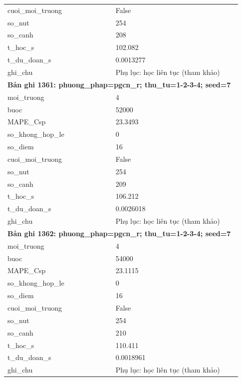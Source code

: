 \begin{longtable}{p{0.43\linewidth}p{0.50\linewidth}}
cuoi\_\allowbreak moi\_\allowbreak truong & False \\
so\_\allowbreak nut & 254 \\
so\_\allowbreak canh & 208 \\
t\_\allowbreak hoc\_\allowbreak s & 102.082 \\
t\_\allowbreak du\_\allowbreak doan\_\allowbreak s & 0.0013277 \\
ghi\_\allowbreak chu & Phụ lục: học liên tục (tham khảo) \\
\midrule
\multicolumn{2}{p{0.95\linewidth}}{\textbf{Bản ghi 1361: phuong\_phap=pgcn\_r; thu\_tu=1-2-3-4; seed=7}} \\
moi\_\allowbreak truong & 4 \\
buoc & 52000 \\
MAPE\_\allowbreak Csp & 23.3493 \\
so\_\allowbreak khong\_\allowbreak hop\_\allowbreak le & 0 \\
so\_\allowbreak diem & 16 \\
cuoi\_\allowbreak moi\_\allowbreak truong & False \\
so\_\allowbreak nut & 254 \\
so\_\allowbreak canh & 209 \\
t\_\allowbreak hoc\_\allowbreak s & 106.212 \\
t\_\allowbreak du\_\allowbreak doan\_\allowbreak s & 0.0026018 \\
ghi\_\allowbreak chu & Phụ lục: học liên tục (tham khảo) \\
\midrule
\multicolumn{2}{p{0.95\linewidth}}{\textbf{Bản ghi 1362: phuong\_phap=pgcn\_r; thu\_tu=1-2-3-4; seed=7}} \\
moi\_\allowbreak truong & 4 \\
buoc & 54000 \\
MAPE\_\allowbreak Csp & 23.1115 \\
so\_\allowbreak khong\_\allowbreak hop\_\allowbreak le & 0 \\
so\_\allowbreak diem & 16 \\
cuoi\_\allowbreak moi\_\allowbreak truong & False \\
so\_\allowbreak nut & 254 \\
so\_\allowbreak canh & 210 \\
t\_\allowbreak hoc\_\allowbreak s & 110.411 \\
t\_\allowbreak du\_\allowbreak doan\_\allowbreak s & 0.0018961 \\
ghi\_\allowbreak chu & Phụ lục: học liên tục (tham khảo) \\

\end{longtable}
